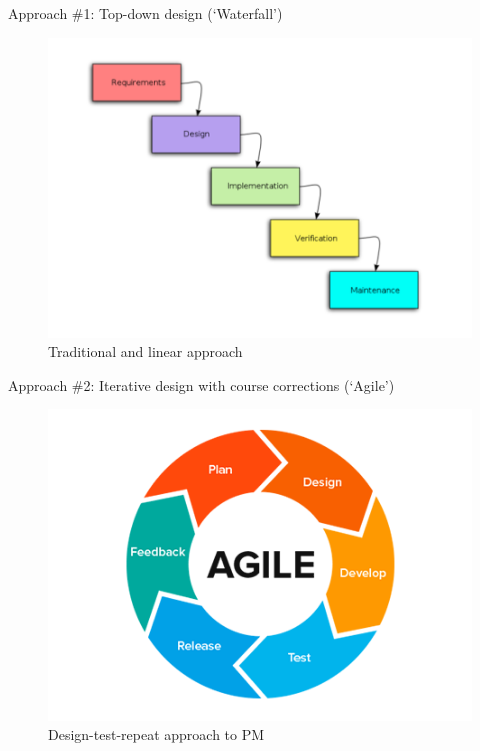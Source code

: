 \documentclass[aspectratio=1610, 11pt]{beamer} %
\begin{document}
 \begin{frame}{Approach \#1: Top-down design (`Waterfall')}
  \begin{figure}[Waterfall]
     \centering
         \includegraphics[height=.75\textheight]{figures/waterfall.png}
         \caption{Traditional and linear approach \cite{Parody2018-if}} 
         \label{fig:6}
  \end{figure}
 \end{frame}

 \begin{frame}{Approach \#2: Iterative design with course corrections (`Agile')}
  \begin{figure}[Agile]
     \centering
         \includegraphics[height=.75\textheight]{figures/agile.png}
         \caption{Design-test-repeat approach to PM \cite{Parody2018-if}} 
         \label{fig:7}
  \end{figure}
 \end{frame}
\end{document}
